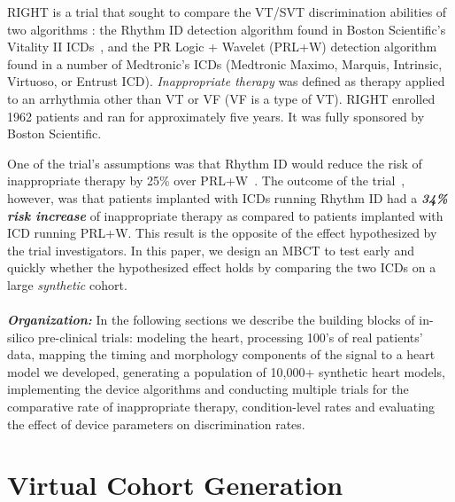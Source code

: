 RIGHT is a trial that sought to compare the VT/SVT discrimination abilities of two algorithms \cite{GoldABBTB11_RIGHTresults}: 
the Rhythm ID detection algorithm found in Boston Scientific's Vitality II ICDs~\cite{compass},
and the PR Logic + Wavelet (PRL+W) detection algorithm found in a number of Medtronic's ICDs (Medtronic Maximo,
Marquis, Intrinsic, Virtuoso, or Entrust ICD).
\emph{Inappropriate therapy} was defined as therapy applied to an arrhythmia other than VT or VF (VF is a type of VT).
RIGHT enrolled 1962 patients and ran for approximately five years.
It was fully sponsored by Boston Scientific. 

One of the trial's assumptions was that Rhythm ID would reduce the risk of inappropriate therapy by 25\% over PRL+W~\cite{Berger06_RIGHT}.
The outcome of the trial~\cite{GoldABBTB11_RIGHTresults}, however, was that patients implanted with ICDs running Rhythm ID had a \emph{\textbf{34\% risk increase}} of inappropriate therapy as compared to patients implanted with ICD running PRL+W. 
This result  is the opposite of the effect hypothesized by the trial investigators. 
In this paper, we design an MBCT to test early and quickly whether the hypothesized effect holds by comparing the two ICDs on a large \emph{synthetic} cohort.\\\\
\textbf{\emph{Organization:}} In the following sections we describe the building blocks of in-silico pre-clinical trials: modeling the heart, processing 100's of real patients' data, mapping the timing and morphology components of the signal to a heart model we developed, generating a population of 10,000+ synthetic heart models, implementing the device algorithms and conducting multiple trials for the comparative rate of inappropriate therapy, condition-level rates and evaluating the effect of device parameters on discrimination rates.

 \section{Virtual Cohort Generation}
 \label{sec:heart modeling}


